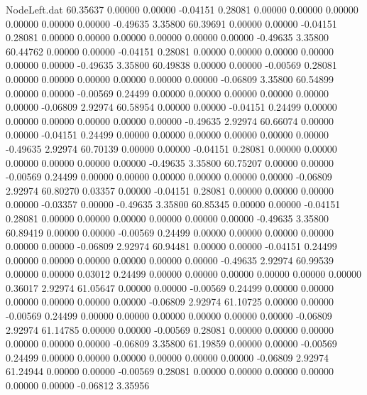 \begin{filecontents}{NodeLeft.dat}
  60.35637    0.00000    0.00000    -0.04151    0.28081    0.00000    0.00000    0.00000    0.00000    0.00000    0.00000   -0.49635    3.35800
  60.39691    0.00000    0.00000    -0.04151    0.28081    0.00000    0.00000    0.00000    0.00000    0.00000    0.00000   -0.49635    3.35800
  60.44762    0.00000    0.00000    -0.04151    0.28081    0.00000    0.00000    0.00000    0.00000    0.00000    0.00000   -0.49635    3.35800
  60.49838    0.00000    0.00000    -0.00569    0.28081    0.00000    0.00000    0.00000    0.00000    0.00000    0.00000   -0.06809    3.35800
  60.54899    0.00000    0.00000    -0.00569    0.24499    0.00000    0.00000    0.00000    0.00000    0.00000    0.00000   -0.06809    2.92974
  60.58954    0.00000    0.00000    -0.04151    0.24499    0.00000    0.00000    0.00000    0.00000    0.00000    0.00000   -0.49635    2.92974
  60.66074    0.00000    0.00000    -0.04151    0.24499    0.00000    0.00000    0.00000    0.00000    0.00000    0.00000   -0.49635    2.92974
  60.70139    0.00000    0.00000    -0.04151    0.28081    0.00000    0.00000    0.00000    0.00000    0.00000    0.00000   -0.49635    3.35800
  60.75207    0.00000    0.00000    -0.00569    0.24499    0.00000    0.00000    0.00000    0.00000    0.00000    0.00000   -0.06809    2.92974
  60.80270    0.03357    0.00000    -0.04151    0.28081    0.00000    0.00000    0.00000    0.00000   -0.03357    0.00000   -0.49635    3.35800
  60.85345    0.00000    0.00000    -0.04151    0.28081    0.00000    0.00000    0.00000    0.00000    0.00000    0.00000   -0.49635    3.35800
  60.89419    0.00000    0.00000    -0.00569    0.24499    0.00000    0.00000    0.00000    0.00000    0.00000    0.00000   -0.06809    2.92974
  60.94481    0.00000    0.00000    -0.04151    0.24499    0.00000    0.00000    0.00000    0.00000    0.00000    0.00000   -0.49635    2.92974
  60.99539    0.00000    0.00000     0.03012    0.24499    0.00000    0.00000    0.00000    0.00000    0.00000    0.00000    0.36017    2.92974
  61.05647    0.00000    0.00000    -0.00569    0.24499    0.00000    0.00000    0.00000    0.00000    0.00000    0.00000   -0.06809    2.92974
  61.10725    0.00000    0.00000    -0.00569    0.24499    0.00000    0.00000    0.00000    0.00000    0.00000    0.00000   -0.06809    2.92974
  61.14785    0.00000    0.00000    -0.00569    0.28081    0.00000    0.00000    0.00000    0.00000    0.00000    0.00000   -0.06809    3.35800
  61.19859    0.00000    0.00000    -0.00569    0.24499    0.00000    0.00000    0.00000    0.00000    0.00000    0.00000   -0.06809    2.92974
  61.24944    0.00000    0.00000    -0.00569    0.28081    0.00000    0.00000    0.00000    0.00000    0.00000    0.00000   -0.06812    3.35956

\end{filecontents}
